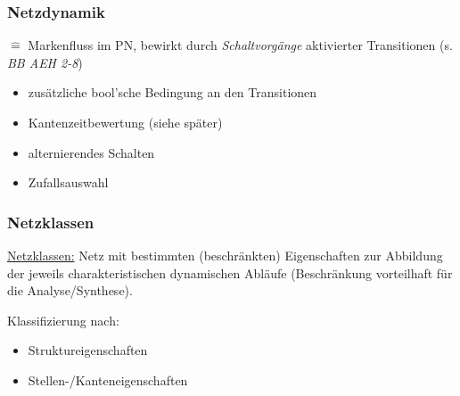 \subsubsection{Netzdynamik} \label{sec:netzdynamik}
$\hat{=}$ Markenfluss im PN, bewirkt durch \textit{Schaltvorgänge} aktivierter Transitionen (s. \textit{BB AEH 2-8})


\begin{itemize}
	\item zusätzliche bool'sche Bedingung an den Transitionen
	\item Kantenzeitbewertung (siehe später)
	\item alternierendes Schalten
	\item Zufallsauswahl
\end{itemize}


\subsubsection{Netzklassen}
\underline{Netzklassen:} Netz mit bestimmten (beschränkten) Eigenschaften zur Abbildung der jeweils charakteristischen dynamischen Abläufe (Beschränkung vorteilhaft für die Analyse/Synthese).

Klassifizierung nach:
\begin{itemize}
	\item Struktureigenschaften
	\item Stellen-/Kanteneigenschaften 
\end{itemize}

